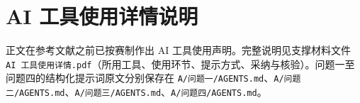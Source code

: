 \section{AI 工具使用详情说明}

正文在参考文献之前已按赛制作出 AI 工具使用声明。完整说明见支撑材料文件 \texttt{AI 工具使用详情.pdf}（所用工具、使用环节、提示方式、采纳与核验）。问题一至问题四的结构化提示词原文分别保存在 \texttt{A/问题一/AGENTS.md}、\texttt{A/问题二/AGENTS.md}、\texttt{A/问题三/AGENTS.md}、\texttt{A/问题四/AGENTS.md}。

